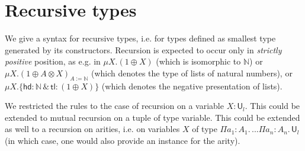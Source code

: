 \documentclass{article}
\newcommand{\mkprod}[3]{\Pi {#1}\!:\!{#2}.\,{#3}}
\newcommand{\nat}{\mathbb{N}}
\newcommand{\headname}{\mathsf{hd}}
\newcommand{\tailname}{\mathsf{tl}}
\newcommand{\sort}[1]{\mathsf{U}_{#1}}
\begin{document}
\section{Recursive types}

\newcommand{\appmu}[3]{(#1)_{#2}^{#3}}
\newcommand{\inmu}[1]{\mathsf{in}\,#1}

We give a syntax for recursive types, i.e. for types defined as
smallest type generated by its constructors. Recursion is expected to
occur only in {\em strictly positive} position, as e.g. in $\mu X.(1
\oplus X)$ (which is isomorphic to $\nat$) or $\mu X.(1 \oplus A
\otimes X)_{A:=\nat}$ (which denotes the type of lists of natural
numbers), or $\mu X.\{\headname : \nat \,\&\, \tailname : (1 \oplus X)\}$ (which
denotes the negative presentation of lists).

We restricted the rules to the case of recursion on a variable
$X:\sort{l}$. This could be extended to mutual recursion on a tuple of
type variable. This could be extended as well to a recursion on
arities, i.e. on variables $X$ of type
$\mkprod{a_1}{A_1}{...\mkprod{a_n}{A_n}{\sort{l}}}$ (in which case,
one would also provide an instance for the arity).
\end{document}

